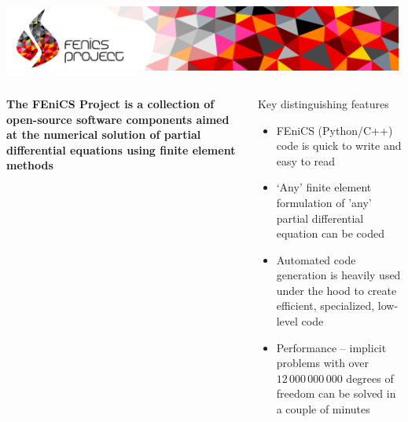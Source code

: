\begin{frame}
\medskip
\includegraphics[width=0.99\textwidth]{png/fenics_banner.png}
\begin{columns}[c]
\begin{column}{0.4\textwidth}
\bf{The FEniCS Project is a collection of open-source software
  components aimed at the numerical solution of partial differential
  equations using finite element methods}
\end{column}
\begin{column}{0.7\textwidth}
  \begin{block}{Key distinguishing features}
  \begin{itemize}
  \item
    FEniCS (Python/C++) code is quick to write and easy to read
  \item
    `Any' finite element formulation of 'any' partial differential
    equation can be coded
  \item
    Automated code generation is heavily used under the hood to
    create efficient, specialized, low-level code
  \item
    Performance -- implicit problems with over $12\, 000\, 000\, 000$
    degrees of freedom can be solved in a couple of minutes
  \end{itemize}
  \end{block}
\end{column}
\end{columns}
  \begin{center}
  \end{center}
\end{frame}
